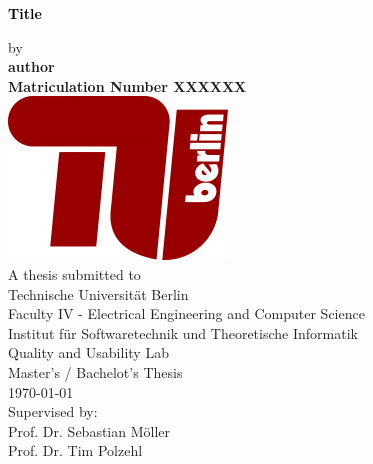 \begin{titlepage}
	\strut
	\hfill
	\begin{center}
	\vspace{0.5cm}
		\Huge
		\begin{spacing}{.9}
			\textcolor{black}{\textbf{Title}}\\
		\end{spacing}
		\vspace{0.8cm}
		\large
		by\\
		\vspace{0.8cm}
		\textbf{author}\\
		\vspace{0.8cm}
		\textbf{Matriculation Number XXXXXX}\\
			\vspace{0.8cm}
		\includegraphics[width=0.2 \textwidth]{images/TUBerlin.png}\\
	 	A thesis submitted to\\
		\vspace{0.8cm}
		Technische Universität Berlin\\
		Faculty IV - Electrical Engineering and Computer Science\\
		Institut für Softwaretechnik und Theoretische Informatik\\
		Quality and Usability Lab\\
		\vspace{0.5cm}
		Master's / Bachelot's Thesis\\
		\vspace{1cm}
		\today\\
		\large
		Supervised by:\\
		Prof. Dr. Sebastian Möller \\
		Prof. Dr. Tim Polzehl \\
		\end{center}

\end{titlepage}


